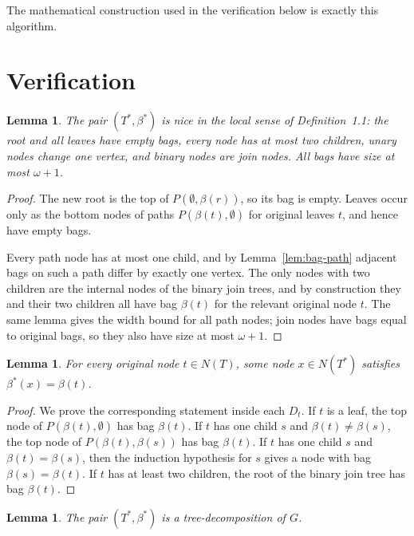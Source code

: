 \documentclass[11pt]{article}
\newtheorem{lemma}[theorem]{Lemma}
\theoremstyle{definition}
\newcommand{\Nodes}{N}
\begin{document}
The mathematical construction used in the verification below is exactly this
algorithm.

\section{Verification}

\begin{lemma}\label{lem:nice-local}
The pair \((T^\ast,\beta^\ast)\) is nice in the local sense of
Definition~1.1: the root and all leaves have empty bags, every node has at most
two children, unary nodes change one vertex, and binary nodes are join nodes.
All bags have size at most \(\omega+1\).
\end{lemma}

\begin{proof}
The new root is the top of \(P(\emptyset,\beta(r))\), so its bag is empty.
Leaves occur only as the bottom nodes of paths \(P(\beta(t),\emptyset)\) for
original leaves \(t\), and hence have empty bags.

Every path node has at most one child, and by Lemma~\ref{lem:bag-path} adjacent
bags on such a path differ by exactly one vertex.  The only nodes with two
children are the internal nodes of the binary join trees, and by construction
they and their two children all have bag \(\beta(t)\) for the relevant original
node \(t\).  The same lemma gives the width bound for all path nodes; join
nodes have bags equal to original bags, so they also have size at most
\(\omega+1\).
\end{proof}

\begin{lemma}\label{lem:original-bags-survive}
For every original node \(t\in\Nodes(T)\), some node
\(x\in\Nodes(T^\ast)\) satisfies \(\beta^\ast(x)=\beta(t)\).
\end{lemma}

\begin{proof}
We prove the corresponding statement inside each \(D_t\).  If \(t\) is a leaf,
the top node of \(P(\beta(t),\emptyset)\) has bag \(\beta(t)\).  If \(t\) has
one child \(s\) and \(\beta(t)\ne\beta(s)\), the top node of
\(P(\beta(t),\beta(s))\) has bag \(\beta(t)\).  If \(t\) has one child \(s\)
and \(\beta(t)=\beta(s)\), then the induction hypothesis for \(s\) gives a
node with bag \(\beta(s)=\beta(t)\).  If \(t\) has at least two children, the
root of the binary join tree has bag \(\beta(t)\).
\end{proof}

\begin{lemma}\label{lem:decomp-axioms}
The pair \((T^\ast,\beta^\ast)\) is a tree-decomposition of \(G\).
\end{lemma}
\end{document}
